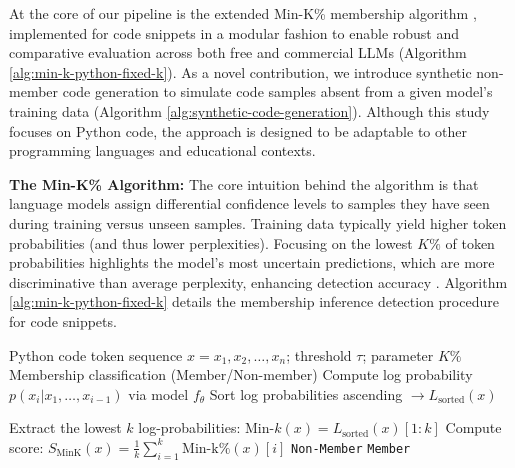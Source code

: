 \documentclass[runningheads]{llncs}
\begin{document}

At the core of our pipeline is the extended Min-K\% membership algorithm \cite{r1}, implemented for code snippets in a modular fashion to enable robust and comparative evaluation across both free and commercial LLMs (Algorithm \ref{alg:min-k-python-fixed-k}). As a novel contribution, we introduce synthetic non-member code generation to simulate code samples absent from a given model’s training data (Algorithm \ref{alg:synthetic-code-generation}). Although this study focuses on Python code, the approach is designed to be adaptable to other programming languages and educational contexts.

\noindent \textbf{The Min-K\% Algorithm:} The core intuition behind the algorithm is that language models assign differential confidence levels to samples they have seen during training versus unseen samples. Training data typically yield higher token probabilities (and thus lower perplexities). Focusing on the lowest \( K\% \) of token probabilities highlights the model's most uncertain predictions, which are more discriminative than average perplexity, enhancing detection accuracy \cite{r1}. Algorithm \ref{alg:min-k-python-fixed-k} details the membership inference detection procedure for code snippets.


\begin{algorithm}[H]
\caption{Membership Inference Detection for \textit{Code Snippets}}
\label{alg:min-k-python-fixed-k}

\begin{algorithmic}[1]

  \Require Python code token sequence \( x = x_1, x_2, \ldots, x_n \); threshold \(\tau\); parameter \(K\%\)
  \Ensure Membership classification (Member/Non-member)
      \State Compute log probability \(p(x_i | x_1,\ldots, x_{i-1})\) via model \(f_\theta\)
  \EndFor
  \State Sort log probabilities ascending \(\to L_{\text{sorted}}(x)\)
  
  \State Extract the lowest \( k \) log-probabilities: \( \text{Min-}k(x) = L_{\text{sorted}}(x)[1 : k] \)
  \State Compute score: $S_{\text{MinK}}(x) = \frac{1}{k}\sum_{i=1}^k \text{Min-k\%}(x)[i]$
    \State \Return \texttt{Non-Member} 
  \Else
    \State \Return \texttt{Member} 
  \EndIf
\end{algorithmic}
\end{algorithm}
\end{document}
